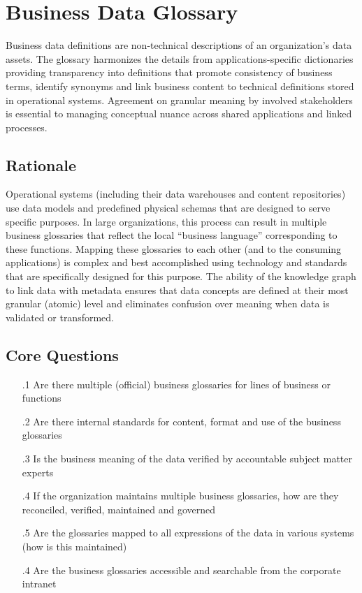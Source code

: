 \section{Business Data Glossary}\label{subsec:b-2-4} %

Business data definitions are non-technical descriptions of an organization’s data assets.
The glossary harmonizes the details from applications-specific dictionaries providing transparency into definitions that promote consistency of business terms, identify synonyms and link business content to technical definitions stored in operational systems.
Agreement on granular meaning by involved stakeholders is essential to managing conceptual nuance across shared applications and linked processes.

\subsection*{ Rationale}

Operational systems (including their data warehouses and content repositories) use data models and predefined physical schemas that are designed to serve specific purposes.
In large organizations, this process can result in multiple business glossaries that reflect the local “business language” corresponding to these functions.
Mapping these glossaries to each other (and to the consuming applications) is complex and best accomplished using technology and standards that are specifically designed for this purpose.
The ability of the knowledge graph to link data with metadata ensures that data concepts are defined at their most granular (atomic) level and eliminates confusion over meaning when data is validated or transformed.

\subsection*{Core Questions}

\begin{itemize}[leftmargin=.5in]
  \item [\thesection.1] Are there multiple (official) business glossaries for lines of business or functions
  \item [\thesection.2] Are there internal standards for content, format and use of the business glossaries
  \item [\thesection.3] Is the business meaning of the data verified by accountable subject matter experts
  \item [\thesection.4] If the organization maintains multiple business glossaries, how are they reconciled, verified, maintained and governed
  \item [\thesection.5] Are the glossaries mapped to all expressions of the data in various systems (how is this maintained)
  \item [\thesection.4] Are the business glossaries accessible and searchable from the corporate intranet

\end{itemize}

